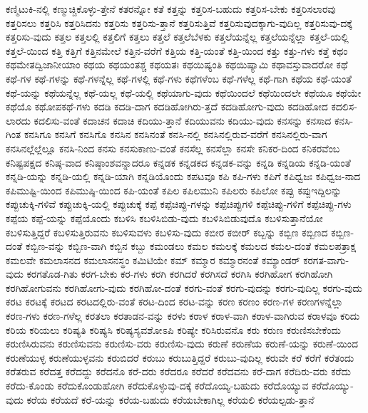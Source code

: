 {ಕಣ್ಮಿಟುಕಿ-ನಲ್ಲಿ
ಕಣ್ಮುಚ್ಚಿಕೊಳ್ಳು-ತ್ತೇನೆ
ಕತರನ್ನೋ
ಕತೆ
ಕತ್ತನ್ನು
ಕತ್ತರಿಸ-ಬಹುದು
ಕತ್ತರಿಸ-ಬೇಕು
ಕತ್ತರಿಸಲಾರವು
ಕತ್ತರಿಸಲು
ಕತ್ತರಿಸಿ
ಕತ್ತರಿಸಿದನು
ಕತ್ತರಿಸು
ಕತ್ತರಿಸು-ತ್ತಾನೆ
ಕತ್ತರಿಸುತ್ತಿವೆ
ಕತ್ತರಿಸುವುದಕ್ಕಾಗು-ವುದಿಲ್ಲ
ಕತ್ತರಿಸುವು-ದಕ್ಕೆ
ಕತ್ತರಿಸು-ವುದು
ಕತ್ತಲ
ಕತ್ತಲಲ್ಲಿ
ಕತ್ತಲಿಗೆ
ಕತ್ತಲು
ಕತ್ತಲೆ
ಕತ್ತಲೆಬೆಳಕು
ಕತ್ತಲೆಯನ್ನೆಲ್ಲ
ಕತ್ತಲೆಯನ್ನೆಲ್ಲಾ
ಕತ್ತಲೆ-ಯಲ್ಲಿ
ಕತ್ತಲೆ-ಯಿಂದ
ಕತ್ತಿ
ಕತ್ತಿಗೆ
ಕತ್ತಿನಮೇಲೆ
ಕತ್ತಿನ-ವರೆಗೆ
ಕತ್ತಿಯ
ಕತ್ತಿ-ಯಂತೆ
ಕತ್ತಿ-ಯಿಂದ
ಕತ್ತು
ಕತ್ತು-ಗಳು
ಕತ್ತೆ
ಕಥಂ
ಕಥಮೇತದ್ವಿಜಾನೀಯಾಂ
ಕಥಯ
ಕಥಯಂತಶ್ಚ
ಕಥಯತಃ
ಕಥಯಿಷ್ಯಂತಿ
ಕಥಯಿಷ್ಯಾಮಿ
ಕಥಾವಸ್ತುವಾದರೋ
ಕಥೆ
ಕಥೆ-ಗಳ
ಕಥೆ-ಗಳನ್ನು
ಕಥೆ-ಗಳನ್ನೆಲ್ಲ
ಕಥೆ-ಗಳಲ್ಲಿ
ಕಥೆ-ಗಳು
ಕಥೆಗಳೆಂಬ
ಕಥೆ-ಗಳೆಲ್ಲ
ಕಥೆ-ಗಾಗಿ
ಕಥೆಯ
ಕಥೆ-ಯಂತೆ
ಕಥೆ-ಯನ್ನು
ಕಥೆಯನ್ನೆಲ್ಲ
ಕಥೆ-ಯಲ್ಲ
ಕಥೆ-ಯಲ್ಲಿ
ಕಥೆಯಾಗು-ವುದು
ಕಥೆಯಿಂದಲೆ
ಕಥೆಯಿಂದಲೇ
ಕಥೆಯೂ
ಕಥೆಯೇ
ಕಥೆಯೊ
ಕಥೋಪಕಥೆ-ಗಳು
ಕದಡಿ
ಕದಡಿ-ದಾಗ
ಕದಡಿಹೋಗಿರು-ತ್ತದೆ
ಕದಡಿಹೋಗು-ವುದು
ಕದಡಿಹೋದ
ಕದಲಿಸ-ಲಾರದು
ಕದಲಿಸು-ವಂತೆ
ಕದಾಚನ
ಕದಾಚಿ
ಕದಿಯು-ತ್ತಾನೆ
ಕದಿಯುವನು
ಕದಿಯು-ವುದು
ಕನಸನ್ನು
ಕನಸಾದ
ಕನಸಿ-ಗಿಂತ
ಕನಸಿಗೂ
ಕನಸಿಗೆ
ಕನಸಿಗೊ
ಕನಸಿನ
ಕನಸಿನಂತೆ
ಕನಸಿ-ನಲ್ಲಿ
ಕನಸಿನಲ್ಲಿರುವ-ವರೆಗೆ
ಕನಸಿನಲ್ಲಿರು-ವಾಗ
ಕನಸಿನಲ್ಲೆಲ್ಲೆಲ್ಲೂ
ಕನಸಿ-ನಿಂದ
ಕನಸು
ಕನಸುಕಾಣು-ವಂತೆ
ಕನಸೆಲ್ಲ
ಕನಸೆಲ್ಲಾ
ಕನಸೇ
ಕನಿಕರ-ದಿಂದ
ಕನಿಕರವೆಂಬ
ಕನಿಷ್ಟಪಕ್ಷದ
ಕನಿಷ್ಠ-ವಾದ
ಕನಿಷ್ಠಾಂಶವನ್ನಾದರೂ
ಕನ್ನಡಕ
ಕನ್ನಡಕದ
ಕನ್ನಡಕ-ವನ್ನು
ಕನ್ನಡಿ
ಕನ್ನಡಿಯ
ಕನ್ನಡಿ-ಯಂತೆ
ಕನ್ನಡಿ-ಯನ್ನು
ಕನ್ನಡಿ-ಯಲ್ಲಿ
ಕನ್ನಡಿ-ಯಾಗಿ
ಕನ್ನಡಿಯೊಂದು
ಕಪಟವೂ
ಕಪಿ
ಕಪಿ-ಗಳು
ಕಪಿಗೆ
ಕಪಿಧ್ವಜಃ
ಕಪಿಧ್ವಜ-ನಾದ
ಕಪಿಮುಷ್ಟಿ-ಯಿಂದ
ಕಪಿಮುಷ್ಠಿ-ಯಿಂದ
ಕಪಿ-ಯಂತೆ
ಕಪಿಲ
ಕಪಿಲಮುನಿ
ಕಪಿಲರು
ಕಪಿಲೋ
ಕಪ್ಪು
ಕಪ್ಪುಇದ್ದಿಲನ್ನು
ಕಪ್ಪುಚುಕ್ಕಿ-ಗಳಿವೆ
ಕಪ್ಪುಚುಕ್ಕಿ-ಯಲ್ಲಿ
ಕಪ್ಪುಚುಕ್ಕೆ
ಕಪ್ಪೆ
ಕಪ್ಪೆಚಿಪ್ಪು-ಗಳನ್ನು
ಕಪ್ಪೆಚಿಪ್ಪುಗಳಿ
ಕಪ್ಪೆಚಿಪ್ಪು-ಗಳಿಗೆ
ಕಪ್ಪೆಚಿಪ್ಪು-ಗಳು
ಕಪ್ಪೆಯ
ಕಪ್ಪೆ-ಯನ್ನು
ಕಪ್ಪೆಯೊಂದು
ಕಬಳಿಸಿ
ಕಬಳಿಸಿಬಿಡು-ವುದು
ಕಬಳಿಸಿಬಿಡುವುದೊ
ಕಬಳಿಸುತ್ತಾನೆಯೋ
ಕಬಳಿಸುತ್ತಿದ್ದರೆ
ಕಬಳಿಸುತ್ತಿರುವನು
ಕಬಳಿಸುವಳು
ಕಬಳಿಸು-ವುದು
ಕಬೀರ
ಕಬೀರ್
ಕಬ್ಬನ್ನು
ಕಬ್ಬಿಣ
ಕಬ್ಬಿಣದ
ಕಬ್ಬಿಣ-ದಂತೆ
ಕಬ್ಬಿಣ-ವನ್ನು
ಕಬ್ಬಿಣ-ವಾಗಿ
ಕಬ್ಬಿನ
ಕಬ್ಬು
ಕಮಂಡಲು
ಕಮಲ
ಕಮಲಕ್ಕೆ
ಕಮಲದ
ಕಮಲ-ದಂತೆ
ಕಮಲಪತ್ರಾಕ್ಷ
ಕಮಲವೇ
ಕಮಲಾಸನದ
ಕಮಲಾಸನಸ್ಥಂ
ಕಮಿಟಿಯೇ
ಕಮ್
ಕಮ್ಮಾರ
ಕಮ್ಮಾರನಂತೆ
ಕಮ್ಯಾಂಡರ್
ಕರಗತ-ವಾಗು-ವುದು
ಕರಗತೊಡ-ಗಿತು
ಕರಗ-ಬೇಕು
ಕರ-ಗಳು
ಕರಗಿ
ಕರಗಿದರೆ
ಕರಗಿಸದೆ
ಕರಗಿಸಿ
ಕರಗಿಹೋಗ
ಕರಗಿಹೋಗಿ
ಕರಗಿಹೋಗುವನು
ಕರಗಿಹೋಗು-ವುದು
ಕರಗಿಹೋ-ದಂತೆ
ಕರಗು-ವಂತೆ
ಕರಗು-ವುದನ್ನು
ಕರಗು-ವುದಿಲ್ಲ
ಕರಗು-ವುದು
ಕರಟ
ಕರಟಕ್ಕೆ
ಕರಟದ
ಕರಟದಲ್ಲಿರು-ವಂತೆ
ಕರಟ-ದಿಂದ
ಕರಟ-ವನ್ನು
ಕರಣ
ಕರಣಂ
ಕರಣ-ಗಳ
ಕರಣಗಳನ್ನೆಲ್ಲಾ
ಕರಣ-ಗಳು
ಕರಣ-ಗಳೆಲ್ಲ
ಕರತಲಾ
ಕರತಾಡನ-ವನ್ನು
ಕರಳು
ಕರಾಳ
ಕರಾಳ-ವಾಗಿ
ಕರಾಳ-ವಾಗಿರುವ
ಕರಾಳವೂ
ಕರಿದು
ಕರಿಯ
ಕರಿಯಲು
ಕರಿಷ್ಯತಿ
ಕರಿಷ್ಯಸಿ
ಕರಿಷ್ಯಸ್ಯವಶೋಽಪಿ
ಕರಿಷ್ಯೇ
ಕರಿಸಿರುವನೊ
ಕರು
ಕರುಣ
ಕರುಣಿಸಬೇಕೆಂದು
ಕರುಣಿಸಿರುವನು
ಕರುಣಿಸುವನು
ಕರುಣಿಸು-ವರು
ಕರುಣಿಸು-ವುದು
ಕರುಣೆ
ಕರುಣೆಯ
ಕರುಣೆ-ಯನ್ನು
ಕರುಣೆ-ಯಿಂದ
ಕರುಣೆಯುಳ್ಳ
ಕರುಣೆಯುಳ್ಳವನು
ಕರುಬಿದರೆ
ಕರುಬು
ಕರುಬುತ್ತಿದ್ದರೆ
ಕರುಬು-ವುದಿಲ್ಲ
ಕರುವೇ
ಕರೆ
ಕರೆಗೆ
ಕರೆತಂದು
ಕರೆತರುವ
ಕರೆದತ್ತ
ಕರೆದದ್ದು
ಕರೆದನೊ
ಕರೆ-ದರು
ಕರೆದರೂ
ಕರೆದರೆ
ಕರೆದವನು
ಕರೆ-ದಾಗ
ಕರೆದಿರು-ವರು
ಕರೆದು
ಕರೆದು-ಕೊಂಡು
ಕರೆದುಕೊಂಡುಹೋಗಿ
ಕರೆದುಕೊಳ್ಳುವು-ದಕ್ಕೆ
ಕರೆದೊಯ್ಯ-ಬಹುದು
ಕರೆದೊಯ್ಯುವ
ಕರೆದೊಯ್ಯು-ವುದು
ಕರೆಯ
ಕರೆಯದೆ
ಕರೆ-ಯನ್ನು
ಕರೆಯ-ಬಹುದು
ಕರೆಯಬೇಕಾಗಿಲ್ಲ
ಕರೆಯಲಿ
ಕರೆಯಲ್ಪಡು-ತ್ತಾನೆ
}
